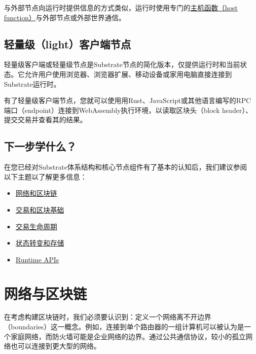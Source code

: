 与外部节点向运行时提供信息的方式类似，运行时使用专门的\href{https://paritytech.github.io/substrate/master/sp_io/index.html}{主机函数（host
function）}与外部节点或外部世界通信。

\hypertarget{ux8f7bux91cfux7ea7lightuxff09ux5ba2ux6237ux7aefux8282ux70b9}{%
\subsection{轻量级（light）客户端节点}\label{ux8f7bux91cfux7ea7lightuxff09ux5ba2ux6237ux7aefux8282ux70b9}}

轻量级客户端或轻量级节点是Substrate节点的简化版本，仅提供运行时和当前状态。它允许用户使用浏览器、浏览器扩展、移动设备或家用电脑直接连接到Substrate运行时。

有了轻量级客户端节点，您就可以使用用Rust、JavaScript或其他语言编写的RPC端口（endpoint）连接到WebAssembly执行环境，以读取区块头（block
header）、提交交易并查看其的结果。

\hypertarget{ux4e0bux4e00ux6b65ux5b66ux4ec0ux4e48}{%
\subsection{下一步学什么？}\label{ux4e0bux4e00ux6b65ux5b66ux4ec0ux4e48}}

在您已经对Substrate体系结构和核心节点组件有了基本的认知后，我们建议参阅以下主题以了解更多信息：

\begin{itemize}
\item
  \href{/fundamentals/node-and-network-types}{网络和区块链}
\item
  \href{/fundamentals/transaction-types}{交易和区块基础}
\item
  \href{/fundamentals/transaction-lifecycle/}{交易生命周期}
\item
  \href{/fundamentals/state-transitions-and-storage/}{状态转变和存储}
\item
  \href{/reference/runtime-apis/}{Runtime APIs}
\end{itemize}

\section{网络与区块链}

在考虑构建区块链时，我们必须要认识到：定义一个网络离不开边界（boundaries）这一概念。例如，连接到单个路由器的一组计算机可以被认为是一个家庭网络，而防火墙可能是企业网络的边界。通过公共通信协议，较小的孤立网络也可以连接到更大型的网络。

